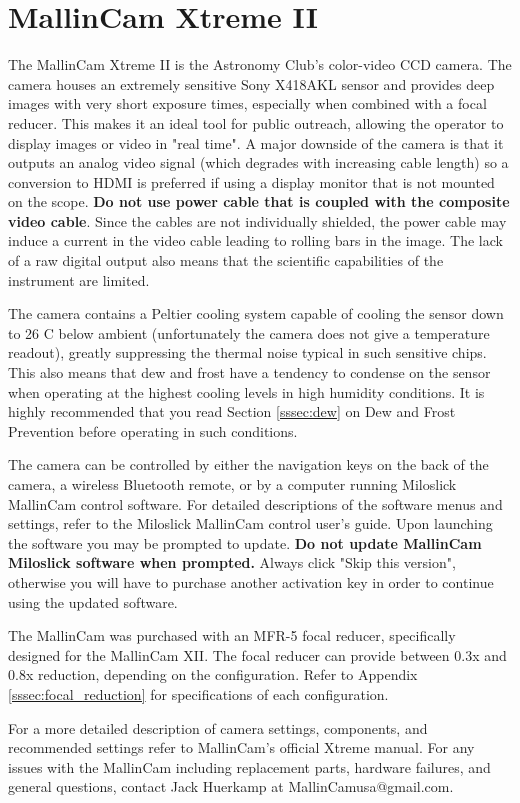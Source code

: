 \documentclass[12pt,titlepage]{article}
\begin{document}
\section{MallinCam Xtreme II}
The MallinCam Xtreme II is the Astronomy Club's color-video CCD camera.
The camera houses an extremely sensitive Sony X418AKL sensor and provides deep images with very short exposure times, especially when combined with a focal reducer.
This makes it an ideal tool for public outreach, allowing the operator to display images or video in "real time".
A major downside of the camera is that it outputs an analog video signal (which degrades with increasing cable length) so a conversion to HDMI is preferred if using a display monitor that is not mounted on the scope.
\textbf{Do not use power cable that is coupled with the composite video cable}.
Since the cables are not individually shielded, the power cable may induce a current in the video cable leading to rolling bars in the image.
The lack of a raw digital output also means that the scientific capabilities of the instrument are limited.
\par The camera contains a Peltier cooling system capable of cooling the sensor down to 26 C below ambient (unfortunately the camera does not give a temperature readout), greatly suppressing the thermal noise typical in such sensitive chips.
This also means that dew and frost have a tendency to condense on the sensor when operating at the highest cooling levels in high humidity conditions.
It is highly recommended that you read Section \ref{sssec:dew} on Dew and Frost Prevention before operating in such conditions.
\par The camera can be controlled by either the navigation keys on the back of the camera, a wireless Bluetooth remote, or by a computer running Miloslick MallinCam control software.
For detailed descriptions of the software menus and settings, refer to the Miloslick MallinCam control user's guide\cite{miloslick}.
Upon launching the software you may be prompted to update.
\textbf{Do not update MallinCam Miloslick software when prompted.}
Always click "Skip this version", otherwise you will have to purchase another activation key in order to continue using the updated software.
\par The MallinCam was purchased with an MFR-5 focal reducer, specifically designed for the MallinCam XII.
The focal reducer can provide between 0.3x and 0.8x reduction, depending on the configuration.
Refer to Appendix \ref{sssec:focal_reduction} for specifications of each configuration.
\par For a more detailed description of camera settings, components, and recommended settings refer to MallinCam's official Xtreme manual\cite{mallincam}. 
For any issues with the MallinCam including replacement parts, hardware failures, and general questions, contact Jack Huerkamp at MallinCamusa@gmail.com.
\end{document}

